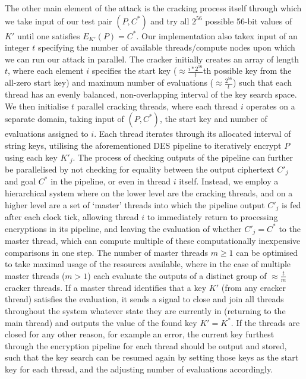 \documentclass[a4paper, 11pt]{article}
\begin{document}
The other main element of the attack is the cracking process itself through which we take input of our test pair $(P, C^{*})$ and try all $2^{56}$ possible 56-bit values of $K'$ until one satisfies $E_{K'}(P) = C^{*}$. Our implementation also takex input of an integer $t$ specifying the number of available threads/compute nodes upon which we can run our attack in parallel. The cracker initially creates an array of length $t$, where each element $i$ specifies the start key ($\approx \frac{i*2^{56}}{t}$th possible key from the all-zero start key) and maximum number of evaluations ($\approx \frac{2^{56}}{t}$) such that each thread has an evenly balanced, non-overlapping interval of the key search space. We then initialise $t$ parallel cracking threads, where each thread $i$ operates on a separate domain, taking input of $(P, C^{*})$, the start key and number of evaluations assigned to $i$. Each thread iterates through its allocated interval of string keys, utilising the aforementioned DES pipeline to iteratively encrypt $P$ using each key $K'_{j}$. The process of checking outputs of the pipeline can further be parallelised by not checking for equality between the output ciphertext $C'_{j}$ and goal $C^{*}$ in the pipeline, or even in thread $i$ itself. Instead, we employ a hierarchical system where on the lower level are the cracking threads, and on a higher level are a set of `master' threads into which the pipeline output $C'_{j}$ is fed after each clock tick, allowing thread $i$ to immediately return to processing encryptions in its pipeline, and leaving the evaluation of whether $C'_{j} = C^{*}$ to the master thread, which can compute multiple of these computationally inexpensive comparisons in one step. The number of master threads $m \geq 1$ can be optimised to take maximal usage of the resources available, where in the case of multiple master threads ($m>1$) each evaluate the outputs of a distinct group of $\approx \frac{t}{m}$ cracker threads. If a master thread identifies that a key $K'$ (from any cracker thread) satisfies the evaluation, it sends a signal to close and join all threads throughout the system whatever state they are currently in (returning to the main thread) and outputs the value of the found key $K' = K^{*}$. If the threads are closed for any other reason, for example an error, the current key furthest through the encryption pipeline for each thread should be output and stored, such that the key search can be resumed again by setting those keys as the start key for each thread, and the adjusting number of evaluations accordingly.
\end{document}
